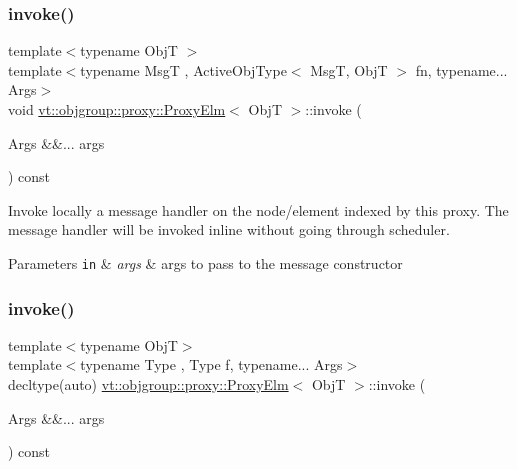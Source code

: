 \subsubsection{\texorpdfstring{invoke()}{invoke()}\hspace{0.1cm}{\footnotesize\ttfamily [1/2]}}
{\footnotesize\ttfamily template$<$typename ObjT $>$ \\
template$<$typename MsgT , Active\+Obj\+Type$<$ Msg\+T, Obj\+T $>$ fn, typename... Args$>$ \\
void \hyperlink{structvt_1_1objgroup_1_1proxy_1_1_proxy_elm}{vt\+::objgroup\+::proxy\+::\+Proxy\+Elm}$<$ ObjT $>$\+::invoke (\begin{DoxyParamCaption}\item[{Args \&\&...}]{args }\end{DoxyParamCaption}) const}



Invoke locally a message handler on the node/element indexed by this proxy. The message handler will be invoked inline without going through scheduler. 


\begin{DoxyParams}[1]{Parameters}
\mbox{\tt in}  & {\em args} & args to pass to the message constructor \\
\hline
\end{DoxyParams}
\mbox{\label{structvt_1_1objgroup_1_1proxy_1_1_proxy_elm_a6dcda2aa12a605aceac3a1bba468e16f}} 
\subsubsection{\texorpdfstring{invoke()}{invoke()}\hspace{0.1cm}{\footnotesize\ttfamily [2/2]}}
{\footnotesize\ttfamily template$<$typename ObjT$>$ \\
template$<$typename Type , Type f, typename... Args$>$ \\
decltype(auto) \hyperlink{structvt_1_1objgroup_1_1proxy_1_1_proxy_elm}{vt\+::objgroup\+::proxy\+::\+Proxy\+Elm}$<$ ObjT $>$\+::invoke (\begin{DoxyParamCaption}\item[{Args \&\&...}]{args }\end{DoxyParamCaption}) const}



